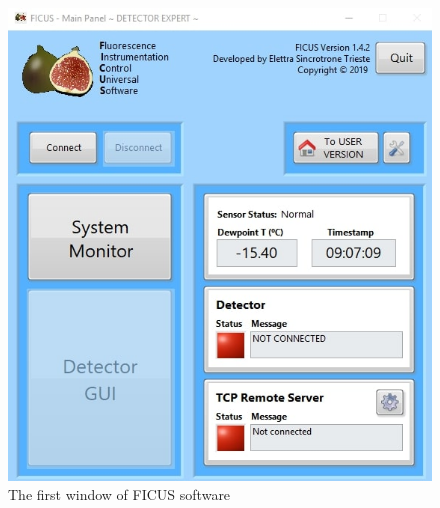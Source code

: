 \documentclass[a4paper,12pt,oneside,pdflatex,italian,final,twocolumn]{article}
\begin{document}
        \begin{figure}[h]
        \centering
        \includegraphics[scale=0.5]{Capture.jpg} \quad %
        \caption{The first window of FICUS software}\label{fig:fig1}
        \end{figure}
        
\end{document}

